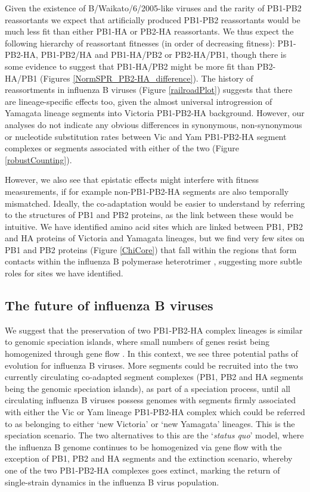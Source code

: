 \documentclass[11pt,oneside,letterpaper]{article}
\begin{document}
Given the existence of B/Waikato/6/2005-like viruses and the rarity of PB1-PB2 reassortants we expect that artificially produced PB1-PB2 reassortants would be much less fit than either PB1-HA or PB2-HA reassortants.
We thus expect the following hierarchy of reassortant fitnesses (in order of decreasing fitness): PB1-PB2-HA, PB1-PB2/HA and PB1-HA/PB2 or PB2-HA/PB1, though there is some evidence to suggest that PB1-HA/PB2 might be more fit than PB2-HA/PB1 (Figures \ref{NormSPR_PB2-HA_difference}).
The history of reassortments in influenza B viruses (Figure \ref{railroadPlot}) suggests that there are lineage-specific effects too, given the almost universal introgression of Yamagata lineage segments into Victoria PB1-PB2-HA background.
However, our analyses do not indicate any obvious differences in synonymous, non-synonymous or nucleotide substitution rates between Vic and Yam PB1-PB2-HA segment complexes or segments associated with either of the two (Figure \ref{robustCounting}).

However, we also see that epistatic effects might interfere with fitness measurements, if for example non-PB1-PB2-HA segments are also temporally mismatched.
Ideally, the co-adaptation would be easier to understand by referring to the structures of PB1 and PB2 proteins, as the link between these would be intuitive.
We have identified amino acid sites which are linked between PB1, PB2 and HA proteins of Victoria and Yamagata lineages, but we find very few sites on PB1 and PB2 proteins (Figure \ref{ChiCore}) that fall within the regions that form contacts within the influenza B polymerase heterotrimer \cite{sugiyama2009}, suggesting more subtle roles for sites we have identified.

\subsection*{The future of influenza B viruses}
We suggest that the preservation of two PB1-PB2-HA complex lineages is similar to genomic speciation islands, where small numbers of genes resist being homogenized through gene flow \cite{turner2005}.
In this context, we see three potential paths of evolution for influenza B viruses.
More segments could be recruited into the two currently circulating co-adapted segment complexes (PB1, PB2 and HA segments being the genomic speciation islands), as part of a speciation process, until all circulating influenza B viruses possess genomes with segments firmly associated with either the Vic or Yam lineage PB1-PB2-HA complex which could be referred to as belonging to either `new Victoria' or `new Yamagata' lineages.
This is the speciation scenario.
The two alternatives to this are the `\textit{status quo}' model, where the influenza B genome continues to be homogenized via gene flow with the exception of PB1, PB2 and HA segments and the extinction scenario, whereby one of the two PB1-PB2-HA complexes goes extinct, marking the return of single-strain dynamics in the influenza B virus population.
\end{document}
